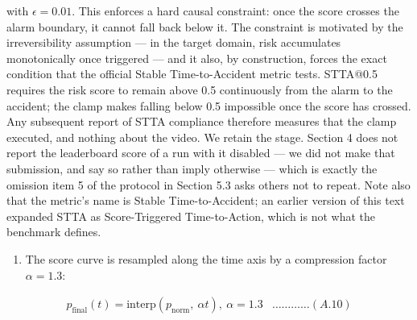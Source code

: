 with \(\epsilon = 0.01\). This enforces a hard causal constraint: once the score crosses the alarm boundary, it cannot fall back below it. The constraint is motivated by the irreversibility assumption --- in the target domain, risk accumulates monotonically once triggered --- and it also, by construction, forces the exact condition that the official Stable Time-to-Accident metric tests. STTA@0.5 requires the risk score to remain above 0.5 continuously from the alarm to the accident; the clamp makes falling below 0.5 impossible once the score has crossed. Any subsequent report of STTA compliance therefore measures that the clamp executed, and nothing about the video. We retain the stage. Section 4 does not report the leaderboard score of a run with it disabled --- we did not make that submission, and say so rather than imply otherwise --- which is exactly the omission item 5 of the protocol in Section 5.3 asks others not to repeat. Note also that the metric's name is Stable Time-to-Accident; an earlier version of this text expanded STTA as Score-Triggered Time-to-Action, which is not what the benchmark defines.

\begin{enumerate}
\def\labelenumi{\arabic{enumi}.}
\setcounter{enumi}{4}
\item
  The score curve is resampled along the time axis by a compression factor \(\alpha = 1.3\):
\end{enumerate}

\[\begin{matrix}
 & p_{\text{final}}(t) = \text{interp}\left( p_{\text{norm}},\ \alpha t \right),\ \alpha = 1.3 & \ldots\ldots\ldots\ldots(A.10) & 
\end{matrix}
\]

